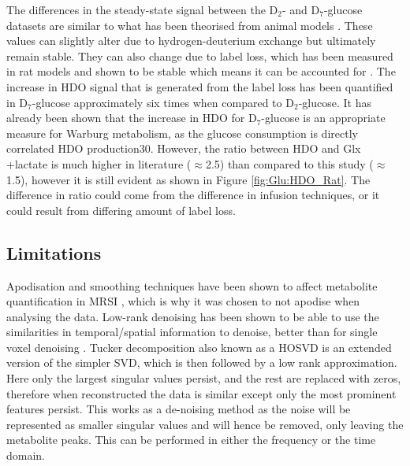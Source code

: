 The differences in the steady-state signal between the D$_2$- and D$_7$-glucose datasets are similar to what has been theorised from animal models \cite{Mahar2021DeuteratedGlucose}. These values can slightly alter due to hydrogen-deuterium exchange but ultimately remain stable. They can also change due to label loss, which has been measured in rat models and shown to be stable which means it can be accounted for \cite{DeGraaf2021CharacterizationStudies}. The increase in \ac{HDO} signal that is generated from the label loss has been quantified in D$_7$-glucose approximately six times when compared to D$_2$-glucose. It has already been shown that the increase in \ac{HDO} for D$_7$-glucose is an appropriate measure for Warburg metabolism, as the glucose consumption is directly correlated HDO production30. However, the ratio between \ac{HDO} and Glx +lactate is much higher in literature ($\approx$2.5) than compared to this study ($\approx$1.5), however it is still evident as shown in Figure \ref{fig:Glu:HDO_Rat}. The difference in ratio could come from the difference in infusion techniques, or it could result from differing amount of label loss.

\subsection{Limitations}

Apodisation and smoothing techniques have been shown to affect metabolite quantification in \ac{MRSI} \cite{Goryawala2020EffectsFitting}, which is why it was chosen to not apodise when analysing the data. Low-rank denoising has been shown to be able to use the similarities in temporal/spatial information to denoise, better than for single voxel denoising \cite{Brender2019DynamicHyperpolarization, Goryawala2020EffectsFitting}. Tucker decomposition also known as a \ac{HOSVD} is an extended version of the simpler \ac{SVD}, which is then followed by a low rank approximation. Here only the largest singular values persist, and the rest are replaced with zeros, therefore when reconstructed the data is similar except only the most prominent features persist. This works as a de-noising method as the noise will be represented as smaller singular values and will hence be removed, only leaving the metabolite peaks. This can be performed in either the frequency or the time domain. 

